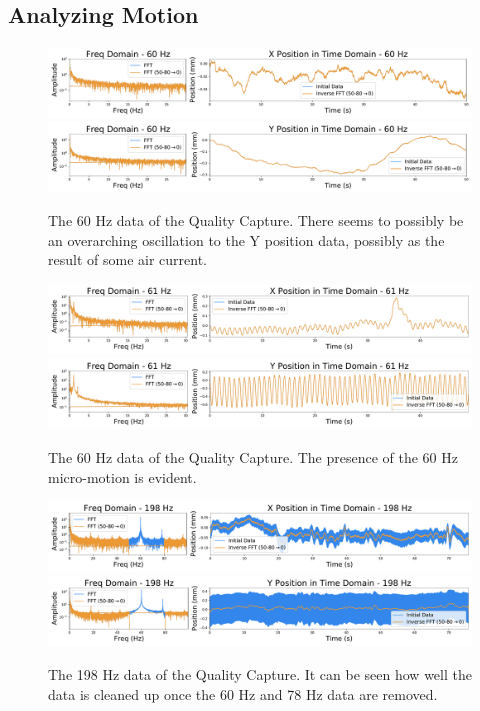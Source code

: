 \documentclass[12pt]{article}
\begin{document}
\subsection{Analyzing Motion}
\begin{figure}[!ht]
\centering
    \includegraphics[width=\textwidth]{data_01_x_pos.pdf}
    \includegraphics[width=\textwidth]{data_01_y_pos.pdf}
	\caption{The 60 Hz data of the Quality Capture. There seems to possibly be an overarching oscillation to the Y position data, possibly as the result of some air current.}
    \label{fig:01_pos}
\end{figure}

\begin{figure}[!ht]
\centering
    \includegraphics[width=\textwidth]{data_03_x_pos.pdf}
    \includegraphics[width=\textwidth]{data_03_y_pos.pdf}
	\caption{The 60 Hz data of the Quality Capture. The presence of the 60 Hz micro-motion is evident.}
    \label{fig:03_pos}
\end{figure}

\begin{figure}[!ht]
\centering
    \includegraphics[width=\textwidth]{data_04_x_pos.pdf}
    \includegraphics[width=\textwidth]{data_04_y_pos.pdf}
	\caption{The 198 Hz data of the Quality Capture. It can be seen how well the data is cleaned up once the 60 Hz and 78 Hz data are removed. }
    \label{fig:04_pos}
\end{figure}
\end{document}
